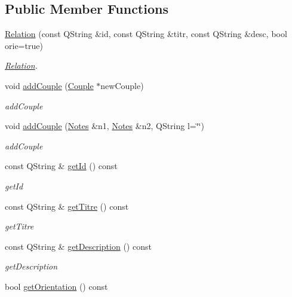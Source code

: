 \subsection*{Public Member Functions}
\begin{DoxyCompactItemize}
\item 
\hyperlink{class_relation_afded55b4b4ae7b23a86f280ad8b49369}{Relation} (const Q\+String \&id, const Q\+String \&titr, const Q\+String \&desc, bool orie=true)
\begin{DoxyCompactList}\small\item\em \hyperlink{class_relation}{Relation}. \end{DoxyCompactList}\item 
void \hyperlink{class_relation_a24e1e3542e1d5b133cd0850e939928b6}{add\+Couple} (\hyperlink{class_couple}{Couple} $\ast$new\+Couple)
\begin{DoxyCompactList}\small\item\em add\+Couple \end{DoxyCompactList}\item 
void \hyperlink{class_relation_a6d7a04daa6d55ff4e4fc3f8de2c168c5}{add\+Couple} (\hyperlink{class_notes}{Notes} \&n1, \hyperlink{class_notes}{Notes} \&n2, Q\+String l=\char`\"{}\char`\"{})
\begin{DoxyCompactList}\small\item\em add\+Couple \end{DoxyCompactList}\item 
const Q\+String \& \hyperlink{class_relation_a928c6b7afd86cbba6c7510e7495aa943}{get\+Id} () const
\begin{DoxyCompactList}\small\item\em get\+Id \end{DoxyCompactList}\item 
const Q\+String \& \hyperlink{class_relation_a411be3a1dfc417342db768555a2afe41}{get\+Titre} () const
\begin{DoxyCompactList}\small\item\em get\+Titre \end{DoxyCompactList}\item 
const Q\+String \& \hyperlink{class_relation_a078c6c43b163152aa40a9ac535175b9e}{get\+Description} () const
\begin{DoxyCompactList}\small\item\em get\+Description \end{DoxyCompactList}\item 
bool \hyperlink{class_relation_a77b7d698e607457ef5b14ded5d0e6f7f}{get\+Orientation} () const

\end{DoxyCompactItemize}
